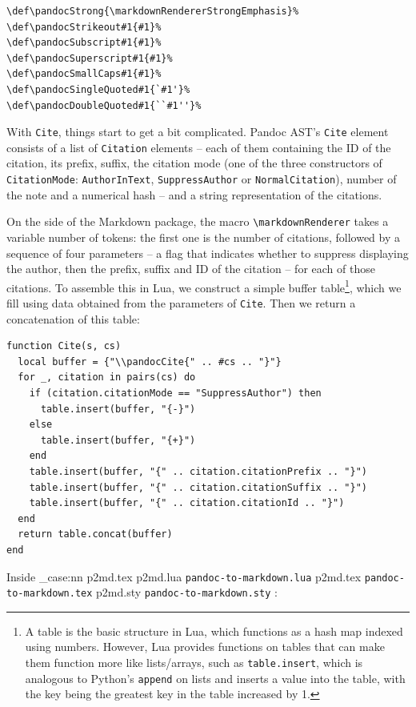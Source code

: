 \documentclass[
  digital,     %
  oneside,     %
  nosansbold,  %
  nocolorbold, %
  lof,         %
  nolot,       %
]{fithesis4}
\newcommand\macro[1]{\texttt{\textbackslash{}{#1}}}
\newcommand\renderer[1]{\macro{markdown\-Renderer\-{#1}}}
\newcommand\file[1]
  {
    \str_case:nn
      { #1 }
      {
        { p2md.lua } { \texttt{pandoc\hyp{}to\hyp{}markdown.lua} }
        { p2md.tex } { \texttt{pandoc\hyp{}to\hyp{}markdown.tex} }
        { p2md.sty } { \texttt{pandoc\hyp{}to\hyp{}markdown.sty} }
      }
  }
\begin{document}
\noindent
\lstset{language=[plain]TeX}
\begin{lstlisting}
\def\pandocStrong{\markdownRendererStrongEmphasis}%
\def\pandocStrikeout#1{#1}%
\def\pandocSubscript#1{#1}%
\def\pandocSuperscript#1{#1}%
\def\pandocSmallCaps#1{#1}%
\def\pandocSingleQuoted#1{`#1'}%
\def\pandocDoubleQuoted#1{``#1''}%
\end{lstlisting}

\noindent
With \texttt{Cite}, things start to get a bit complicated. Pandoc AST's \texttt{Cite} element consists of a list of \texttt{Citation} elements -- each of them containing the ID of the citation, its prefix, suffix, the citation mode (one of the three constructors of \texttt{CitationMode}: \texttt{AuthorInText}, \texttt{SuppressAuthor} or \texttt{NormalCitation}), number of the note and a numerical hash -- and a string representation of the citations.

On the side of the Markdown package, the macro \renderer{Cite} takes a variable number of tokens: the first one is the number of citations, followed by a sequence of four parameters -- a flag that indicates whether to suppress displaying the author, then the prefix, suffix and ID of the citation -- for each of those citations. To assemble this in Lua, we construct a simple buffer table\footnote{A table is the basic structure in Lua, which functions as a hash map indexed using numbers. However, Lua provides functions on tables that can make them function more like lists/arrays, such as \texttt{table.insert}, which is analogous to Python's \texttt{append} on lists and inserts a value into the table, with the key being the greatest key in the table increased by 1.}, which we fill using data obtained from the parameters of \texttt{Cite}. Then we return a concatenation of this table:

\noindent
\lstset{language=[5.3]Lua}
\begin{lstlisting}
function Cite(s, cs)
  local buffer = {"\\pandocCite{" .. #cs .. "}"}
  for _, citation in pairs(cs) do
    if (citation.citationMode == "SuppressAuthor") then
      table.insert(buffer, "{-}")
    else
      table.insert(buffer, "{+}")
    end
    table.insert(buffer, "{" .. citation.citationPrefix .. "}")
    table.insert(buffer, "{" .. citation.citationSuffix .. "}")
    table.insert(buffer, "{" .. citation.citationId .. "}")
  end
  return table.concat(buffer)
end
\end{lstlisting}

\noindent
Inside \file{p2md.tex}:
\end{document}
